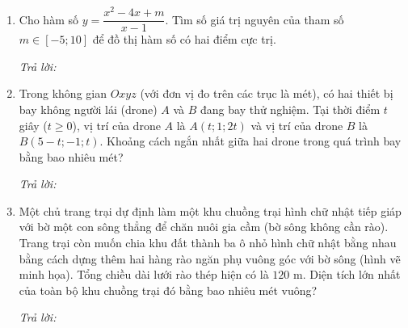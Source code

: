 \documentclass[12pt,a4paper]{article}
\newcommand{\otraloi}{\par\nobreak\smallskip\noindent\textit{Trả lời:}\quad\fbox{\rule{0pt}{11pt}\makebox[0.3cm]{}}\,\fbox{\rule{0pt}{11pt}\makebox[0.3cm]{}}\,\fbox{\rule{0pt}{11pt}\makebox[0.3cm]{}}\,\fbox{\rule{0pt}{11pt}\makebox[0.3cm]{}}}
\begin{document}
\newpage
\begin{enumerate}[start=3]
\item Cho hàm số $y=\dfrac{x^2-4x+m}{x-1}$. Tìm số giá trị nguyên của tham số $m\in[-5;10]$ để đồ thị hàm số có hai điểm cực trị.
\otraloi

\item Trong không gian $Oxyz$ (với đơn vị đo trên các trục là mét), có hai thiết bị bay không người lái (drone) $A$ và $B$ đang bay thử nghiệm. Tại thời điểm $t$ giây ($t\ge 0$), vị trí của drone $A$ là $A(t;1;2t)$ và vị trí của drone $B$ là $B(5-t;-1;t)$. Khoảng cách ngắn nhất giữa hai drone trong quá trình bay bằng bao nhiêu mét?
\otraloi

\item Một chủ trang trại dự định làm một khu chuồng trại hình chữ nhật tiếp giáp với bờ một con sông thẳng để chăn nuôi gia cầm (bờ sông không cần rào). Trang trại còn muốn chia khu đất thành ba ô nhỏ hình chữ nhật bằng nhau bằng cách dựng thêm hai hàng rào ngăn phụ vuông góc với bờ sông (hình vẽ minh họa). Tổng chiều dài lưới rào thép hiện có là $120\text{ m}$. Diện tích lớn nhất của toàn bộ khu chuồng trại đó bằng bao nhiêu mét vuông?
\begin{center}
\par{}
\end{center}
\otraloi


\end{enumerate}
\end{document}
